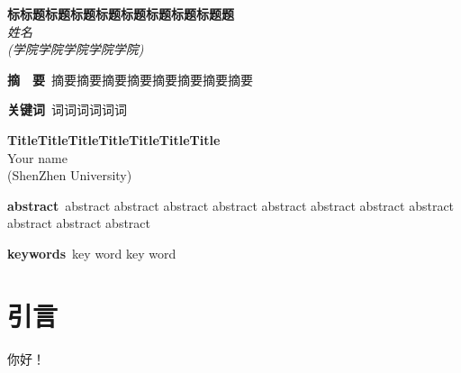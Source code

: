 \documentclass[a4paper,zihao=5,UTF8]{ctexart}
\begin{document}
\twocolumn


\begin{figure*}[t]
	\begin{minipage}{0.99\textwidth}

		\begin{center}
			\Large
			\textbf{标标题标题标题标题标题标题标题标题题}
			\\[10pt]
			\normalsize
			\textit{姓名}
			\\[8pt]
			\small
			\textit{(学院学院学院学院学院)}
		\end{center}

		\small
		\noindent\textbf{摘　要}\
		摘要摘要摘要摘要摘要摘要摘要摘要

		\noindent\textbf{关键词}\ 词词词词词词

		\begin{center}
			\Large
			\textbf{TitleTitleTitleTitleTitleTitleTitle}
			\\[10pt]
			\normalsize
			Your name
			\\[8pt]
			\small
			(ShenZhen University)
		\end{center}

		\small
		\noindent\textbf{abstract}\ abstract abstract abstract abstract abstract abstract abstract abstract abstract abstract abstract

		\noindent\textbf{keywords}\ key word key word

		\normalsize

	\end{minipage}
\end{figure*}

\vspace*{0.999\textheight}

\quad

\tableofcontents


\section{引言}

你好！

%
%



\end{document}
